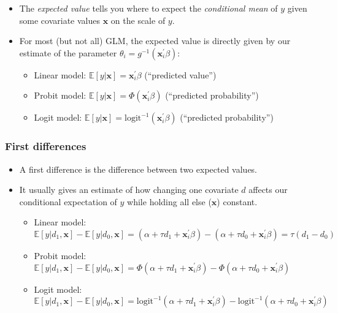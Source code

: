 \documentclass[
  11pt,
]{article}
\providecommand{\tightlist}{%
  \setlength{\itemsep}{0pt}\setlength{\parskip}{0pt}}
\begin{document}
\begin{itemize}
\tightlist
\item
  The \emph{expected value} tells you where to expect the \emph{conditional mean} of \(y\) given some covariate values \(\mathbf{x}\) on the scale of \(y\).
\item
  For most (but not all) GLM, the expected value is directly given by our estimate of the parameter \(\theta_i = g^{-1}(\mathbf{x}_i^{\prime} \beta)\):

  \begin{itemize}
  \tightlist
  \item
    Linear model: \(\mathbb{E}[y|\mathbf{x}] = \mathbf{x}_i^{\prime} \beta\) (``predicted value'')
  \item
    Probit model: \(\mathbb{E}[y|\mathbf{x}] = \Phi(\mathbf{x}_i^{\prime} \beta)\) (``predicted probability'')
  \item
    Logit model: \(\mathbb{E}[y|\mathbf{x}] = \text{logit}^{-1}(\mathbf{x}_i^{\prime} \beta)\) (``predicted probability'')
  \end{itemize}
\end{itemize}

\hypertarget{first-differences}{%
\subsubsection{First differences}\label{first-differences}}

\begin{itemize}
\tightlist
\item
  A first difference is the difference between two expected values.
\item
  It usually gives an estimate of how changing one covariate \(d\) affects our conditional expectation of \(y\) while holding all else (\(\mathbf{x}\)) constant.

  \begin{itemize}
  \tightlist
  \item
    Linear model: \(\mathbb{E}[y|d_1, \mathbf{x}] - \mathbb{E}[y| d_0,\mathbf{x}] = (\alpha + \tau d_1 + \mathbf{x}_i^{\prime} \beta) - (\alpha + \tau d_0 + \mathbf{x}_i^{\prime} \beta) = \tau (d_1 - d_0)\)
  \item
    Probit model: \(\mathbb{E}[y|d_1, \mathbf{x}] - \mathbb{E}[y| d_0,\mathbf{x}] = \Phi(\alpha + \tau d_1 + \mathbf{x}_i^{\prime} \beta)- \Phi(\alpha + \tau d_0 + \mathbf{x}_i^{\prime} \beta)\)
  \item
    Logit model: \(\mathbb{E}[y|d_1, \mathbf{x}] - \mathbb{E}[y| d_0,\mathbf{x}] = \text{logit}^{-1}(\alpha + \tau d_1 + \mathbf{x}_i^{\prime} \beta)- \text{logit}^{-1}(\alpha + \tau d_0 + \mathbf{x}_i^{\prime} \beta)\)
  \end{itemize}
\end{itemize}
\end{document}

